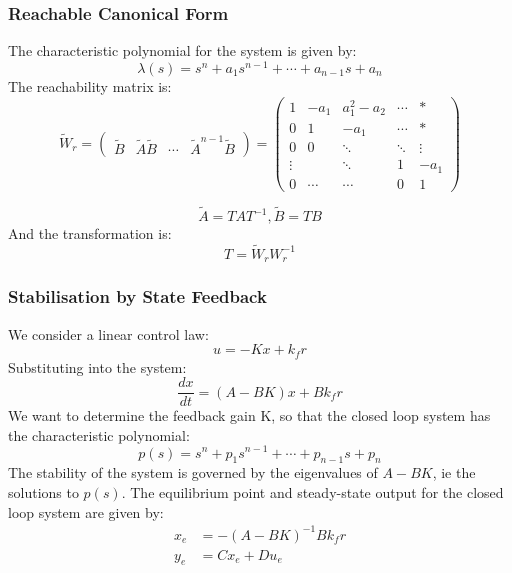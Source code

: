 \documentclass{beamer}
\theoremstyle{remark}
\begin{document}
\begin{frame}
\frametitle{Reachable Canonical Form}
The characteristic polynomial for the system is given by: 
\begin{equation}
    \lambda (s) = s^n + a_1 s^{n-1} + \cdots + a_{n-1} s + a_n
\end{equation}
The reachability matrix is: 
\begin{equation}
    \tilde{W}_r = 
    \begin{pmatrix}
        \tilde{B} & \tilde{A}\tilde{B} & \cdots & \tilde{A}^{n-1} \tilde{B}
    \end{pmatrix}
    =
    \begin{pmatrix}
1 & -a_1 & a_1^2 - a_2 & \cdots & * \\
0 & 1 & -a_1 & \cdots & * \\
0 & 0 & \ddots & \ddots & \vdots \\
\vdots & & \ddots & 1 & -a_1 \\
0 & \cdots & \cdots & 0 & 1
\end{pmatrix}
\end{equation}

\begin{equation}
    \tilde{A} = TAT^{-1}, \tilde{B} = TB
\end{equation}
And the transformation is: 
\begin{equation}
    T = \tilde{W}_r W_r^{-1}
\end{equation}
\end{frame}

\begin{frame}
\frametitle{Stabilisation by State Feedback}
We consider a linear control law:
\begin{equation}
    u = -Kx + k_f r
\end{equation}
Substituting into the system: 
\begin{equation}
    \frac{dx}{dt} = (A - BK)x + B k_f r
\end{equation}
We want to determine the feedback gain K, so that the closed loop system has the characteristic polynomial: 
\begin{equation}
    p(s) = s^n + p_1 s^{n-1} + \cdots + p_{n-1} s + p_n
\end{equation}
The stability of the system is governed by the eigenvalues of $A-BK$, ie the solutions to $p(s)$.
The equilibrium point and steady-state output for the closed loop system are given by: 
\begin{equation}
\begin{aligned}
    x_e &= -(A-BK)^{-1} Bk_f r \\
    y_e &= Cx_e + Du_e
\end{aligned}
\end{equation}
\end{frame}
\end{document}
